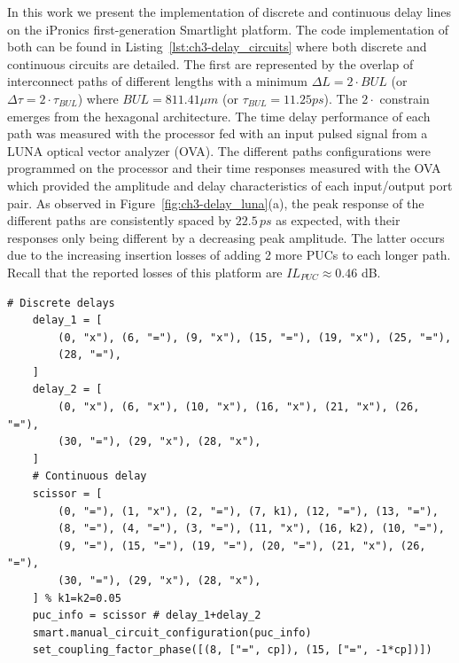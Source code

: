 In this work we present the implementation of discrete and continuous delay lines on the iPronics first-generation Smartlight platform.
The code implementation of both can be found in Listing~\ref{lst:ch3-delay_circuits} where both discrete and continuous circuits are detailed.
The first are represented by the overlap of interconnect paths of different lengths with a minimum \(\Delta L = 2\cdot BUL\) (or \(\Delta \tau = 2\cdot \tau_{BUL}\)) where \(BUL = 811.41 \mu m\) (or \(\tau_{BUL} = 11.25 ps\)).
The \(2\cdot \) constrain emerges from the hexagonal architecture.
The time delay performance of each path was measured with the processor fed with an input pulsed signal from a LUNA optical vector analyzer (OVA).
The different paths configurations were programmed on the processor and their time responses measured with the OVA which provided the amplitude and delay characteristics of each input/output port pair.
As observed in Figure~\ref{fig:ch3-delay_luna}(a), the peak response of the different paths are consistently spaced by \(22.5\,ps\) as expected, with their responses only being different by a decreasing peak amplitude.
The latter occurs due to the increasing insertion losses of adding 2 more PUCs to each longer path.
Recall that the reported losses of this platform are \(IL_{PUC} \approx 0.46\) dB.
\\ %

\begin{lstlisting}[caption={Configuration of discrete and continuous delay lines using the first-generation Smartlight API}, label=lst:ch3-delay_circuits]
	# Discrete delays
	delay_1 = [
		(0, "x"), (6, "="), (9, "x"), (15, "="), (19, "x"), (25, "="),
		(28, "="),
	]
	delay_2 = [
		(0, "x"), (6, "x"), (10, "x"), (16, "x"), (21, "x"), (26, "="),
		(30, "="), (29, "x"), (28, "x"),
	]
	# Continuous delay
	scissor = [
		(0, "="), (1, "x"), (2, "="), (7, k1), (12, "="), (13, "="),
		(8, "="), (4, "="), (3, "="), (11, "x"), (16, k2), (10, "="),
		(9, "="), (15, "="), (19, "="), (20, "="), (21, "x"), (26, "="),
		(30, "="), (29, "x"), (28, "x"),
	] % k1=k2=0.05
	puc_info = scissor # delay_1+delay_2
	smart.manual_circuit_configuration(puc_info)
	set_coupling_factor_phase([(8, ["=", cp]), (15, ["=", -1*cp])])
\end{lstlisting}

